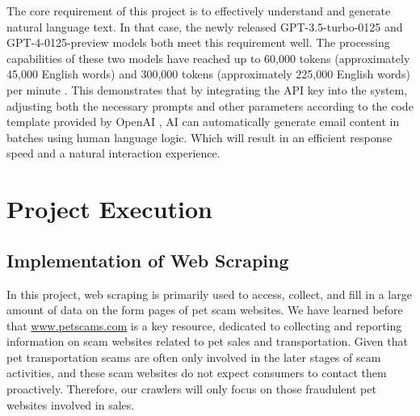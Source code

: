 \documentclass[ oneside,%
                    author={Cassie Qing Tang},
                    degree={BSc},
                     title={The Report for 3D Modelling of Queens Library \\ },
                    subtitle={ }]{dissertation}
\begin{document}
The core requirement of this project is to effectively understand and generate natural language text. In that case, the newly released GPT-3.5-turbo-0125 and GPT-4-0125-preview models both meet this requirement well. The processing capabilities of these two models have reached up to 60,000 tokens (approximately 45,000 English words) and 300,000 tokens (approximately 225,000 English words) per minute \cite{noauthor_openai_nodate}. This demonstrates that by integrating the API key into the system, adjusting both the necessary prompts and other parameters according to the code template provided by OpenAI \cite{noauthor_openai_nodate}, AI can automatically generate email content in batches using human language logic. Which will result in an efficient response speed and a natural interaction experience.




\chapter{Project Execution}
\section{Implementation of Web Scraping}
In this project, web scraping is primarily used to access, collect, and fill in a large amount of data on the form pages of pet scam websites. We have learned before that \url{www.petscams.com} is a key resource, dedicated to collecting and reporting information on scam websites related to pet sales and transportation. Given that pet transportation scams are often only involved in the later stages of scam activities, and these scam websites do not expect consumers to contact them proactively. Therefore, our crawlers will only focus on those fraudulent pet websites involved in sales.
\end{document}
